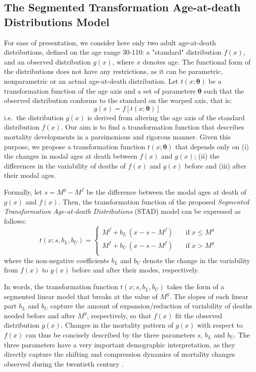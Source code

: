 \documentclass[Thesis]{subfiles}
\begin{document}
\subsection{The Segmented Transformation Age-at-death Distributions Model}\label{Subsec:Ch3subsec2.1}

For ease of presentation, we consider here only two adult age-at-death distributions, defined on the age range 30-110: a "standard" distribution $f(x)$, and an observed distribution $g(x)$, where $x$ denotes age. The functional form of the distributions does not have any restrictions, as it can be parametric, nonparametric or an actual age-at-death distribution. Let $t(x;\bm{\theta})$ be a transformation function of the age axis and a set of parameters $\bm{\theta}$ such that the observed distribution conforms to the standard on the  warped axis, that is:
% 
\begin{equation}\label{eq_gxftx}
g(x) = f\left[t(x;\bm{\theta})\right] \, \, 
\end{equation}
%
i.e.~the distribution $g(x)$ is derived from altering the age axis of the standard distribution $f(x)$. Our aim is to find a transformation function that describes mortality developments in a parsimonious and rigorous manner. Given this purpose, we propose a transformation function $t(x;\bm{\theta})$ that depends only on (i) the changes in modal ages at death between $f(x)$ and $g(x)$; (ii) the differences in the variability of deaths of $f(x)$ and $g(x)$ before and (iii) after their modal ages. 

Formally, let $s = M^{g} - M^{f}$ be the difference between the modal ages at death of $g(x)$ and $f(x)$. Then, the transformation function of the proposed \emph{Segmented Transformation Age-at-death Distributions} (STAD) model can be expressed as follows:  
\begin{equation}\label{eqtx}
t(x;s,b_{L},b_{U}) = \left\{ \begin{array}{ll}
M^{f} + b_{L} \, (x - s - M^{f}) \quad & \mathrm{if} \; x \leq M^{g} \\
M^{f} + b_{U} \, (x - s - M^{f}) \quad & \mathrm{if} \; x >  M^{g} \\
\end{array}
\right.
\end{equation}
where the non-negative coefficients $b_{L}$ and $b_{U}$ denote the change in the variability from $f(x)$ to $g(x)$ before and after their modes, respectively.    

In words, the transformation function $t(x;s,b_{L},b_{U})$ takes the form of a segmented linear model that breaks at the value of $M^{g}$. The slopes of each linear part $b_{L}$ and $b_{U}$ capture the amount of expansion/reduction of variability of deaths needed before and after $M^{g}$, respectively, so that $f(x)$ fit the observed distribution $g(x)$. Changes in the mortality pattern of $g(x)$ with respect to $f(x)$ can thus be concisely described by the three parameters $s$, $b_{L}$ and $b_{U}$. The three parameters have a very important demographic interpretation, as they directly capture the shifting and compression dynamics of mortality changes observed during the twentieth century \citep{fries1980aging,wilmoth1999rectangularization,bongaarts2005long,canudas2008modal}.  
\end{document}
